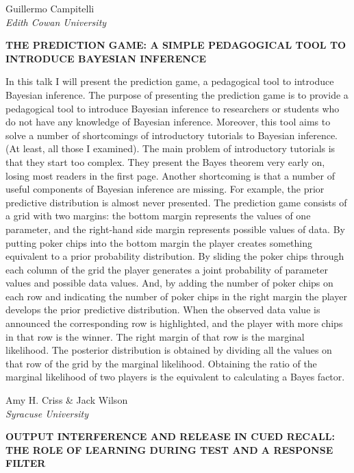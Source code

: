 \documentclass[]{article}
\begin{document}
Guillermo Campitelli\\
\emph{Edith Cowan University }

\textbf{THE PREDICTION GAME: A SIMPLE PEDAGOGICAL TOOL TO INTRODUCE
BAYESIAN INFERENCE}

In this talk I will present the prediction game, a pedagogical tool to
introduce Bayesian inference. The purpose of presenting the prediction
game is to provide a pedagogical tool to introduce Bayesian inference to
researchers or students who do not have any knowledge of Bayesian
inference. Moreover, this tool aims to solve a number of shortcomings of
introductory tutorials to Bayesian inference. (At least, all those I
examined). The main problem of introductory tutorials is that they start
too complex. They present the Bayes theorem very early on, losing most
readers in the first page. Another shortcoming is that a number of
useful components of Bayesian inference are missing. For example, the
prior predictive distribution is almost never presented. The prediction
game consists of a grid with two margins: the bottom margin represents
the values of one parameter, and the right-hand side margin represents
possible values of data. By putting poker chips into the bottom margin
the player creates something equivalent to a prior probability
distribution. By sliding the poker chips through each column of the grid
the player generates a joint probability of parameter values and
possible data values. And, by adding the number of poker chips on each
row and indicating the number of poker chips in the right margin the
player develops the prior predictive distribution. When the observed
data value is announced the corresponding row is highlighted, and the
player with more chips in that row is the winner. The right margin of
that row is the marginal likelihood. The posterior distribution is
obtained by dividing all the values on that row of the grid by the
marginal likelihood. Obtaining the ratio of the marginal likelihood of
two players is the equivalent to calculating a Bayes factor.\\
\pagebreak  

Amy H. Criss \& Jack Wilson\\
\emph{Syracuse University}

\textbf{OUTPUT INTERFERENCE AND RELEASE IN CUED RECALL: THE ROLE OF
LEARNING DURING TEST AND A RESPONSE FILTER}
\end{document}
